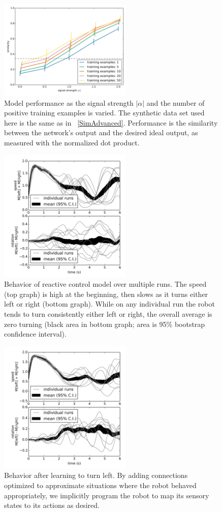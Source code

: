 \documentclass{frontiersSCNS}
\begin{document}
\begin{figure}[h!]
\centering
\includegraphics[width=2.5in]{../figures/plot_grid.png}
\caption{Model performance as the signal strength $|\alpha|$ and the number
of positive training examples is varied.  The synthetic data set used here is
the same as in \figurename~\ref{SimAdvanced}.  Performance is the similarity
between the network's output and the desired ideal output, as measured with
the normalized dot product.}
\label{SimData}
\end{figure}

\begin{figure}[h!]
\centering
\includegraphics[width=2.5in]{../figures/basic/basic.png}
\caption{Behavior of reactive control model over multiple runs. The speed (top graph) is high at the beginning, then slows as it turns either left or right (bottom graph). While on any individual run the robot tends to turn consistently either left or right, the overall average is zero turning (black area in bottom graph; area is 95\% bootstrap confidence interval).}
\label{React}
\end{figure}

\begin{figure}[h!]
\centering
\includegraphics[width=2.5in]{../figures/learn-left/learnleft.png}
\caption{Behavior after learning to turn left. By adding connections optimized to approximate situations where the robot behaved appropriately, we implicitly program the robot to map its sensory states to its actions as desired.}
\label{Left}
\end{figure}
\end{document}
